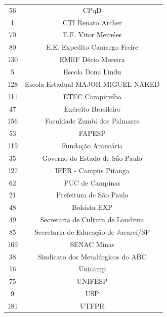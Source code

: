 \begin{table}[htb]
\begin{tabular}{|c|c|}
                   56  &  CPqD                                                                              \\
                    1  &  CTI Renato Archer                                                                 \\
                   70  &  E.E. Vitor Meireles                                                               \\
                   80  &  E.E. Expedito Camargo Freire                                                      \\
                  130  &  EMEF Décio Moreira \\
                    5  &  Escola Dona Lindu \\
                  128  &  Escola Estadual MAJOR MIGUEL NAKED \\
                  111  &  ETEC Carapicuíba \\
                   47  &  Exército Brasileiro \\
                  156  &  Faculdade Zumbi dos Palmares \\
                   53  &  FAPESP \\
                  119  &  Fundação Araucária \\
                   35  &  Governo do Estado de São Paulo \\
                  127  &  IFPR - Campus Pitanga \\
                   62  &  PUC de Campinas \\
                   21  &  Prefeitura de São Paulo           \\
                   48  &  Bolsista EXP \\
                   49  &  Secretaria de Cultura de Londrina \\
                   85  &  Secretaria de Educação de Jacareí/SP \\
                  169  &  SENAC Minas  \\
                   38  &  Sindicato dos Metalúrgicos do ABC \\
                   16  &  Unicamp \\
                   75  &  UNIFESP  \\
                    9  &  USP \\
                  181  &  UTFPR \\
\hline
\end{tabular}
\end{table}


